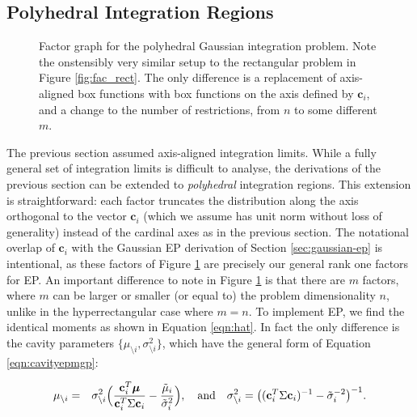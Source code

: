 \documentclass[twoside,11pt]{article}
\newcommand{\II}{\mathbb{I}}
\def\x{{\mathbf x}}
\def\c{{\mathbf c}}
\def\m{{\mathbf m}}
\def\boldmu{\bm{\mu}}
\newcommand{\wo}{\setminus}
\begin{document}
\subsection{Polyhedral Integration Regions}
\label{sec:polyh-integr-regi}

\begin{figure}[ht]
  \centering
  \caption{Factor graph for the polyhedral Gaussian integration
    problem. Note the onstensibly very similar setup to the rectangular problem in Figure \ref{fig:fac_rect}. The only difference is a replacement of axis-aligned box functions with box functions on the axis defined by $\c_i$, and a change to the number of restrictions, from $n$ to some different $m$.}
  \label{fig:fac_polyhedral}
\end{figure}

The previous section assumed axis-aligned integration limits. While a fully general set of integration limits is difficult to analyse, the derivations of the previous section can be extended to \emph{polyhedral} integration regions. This extension is straightforward: each factor truncates the distribution along the axis orthogonal to the vector $\c_i$ (which we assume has unit norm without loss of generality) instead of the cardinal axes as in the previous section.  The notational overlap of $\c_i$ with the Gaussian EP derivation of Section \ref{sec:gaussian-ep} is intentional, as these factors of Figure \ref{fig:fac_polyhedral} are precisely our general rank one factors for EP. An important difference to note in Figure \ref{fig:fac_polyhedral} is that there are $m$ factors, where $m$ can be larger or smaller (or equal to) the problem dimensionality $n$, unlike in the hyperrectangular case where $m=n$.  To implement EP, we find the identical moments as shown in Equation \ref{eqn:hat}. In fact the only difference is the cavity parameters $\{\mu_{\wo i},\sigma^2_{\wo i}\}$, which have the general form of Equation \ref{eqn:cavityepmgp}:

  \begin{eqnarray}
\label{eqn:cavityepmgpPoly}
\mu_{\wo i} & = &  \sigma_{\wo i}^2 \Bigl( \frac{\c_i^T\boldmu}{\c_i^T\Sigma\c_i} - \frac{\tilde{\mu}_i}{\tilde{\sigma}_i^2} \Bigr)
,~~~\mathrm{and}~~~
\sigma^2_{\wo i} = \bigl( (\c_i^T\Sigma \c_i)^{-1} - \tilde{\sigma}^{-2}_i\bigr)^{-1}.
\end{eqnarray}
\end{document}
